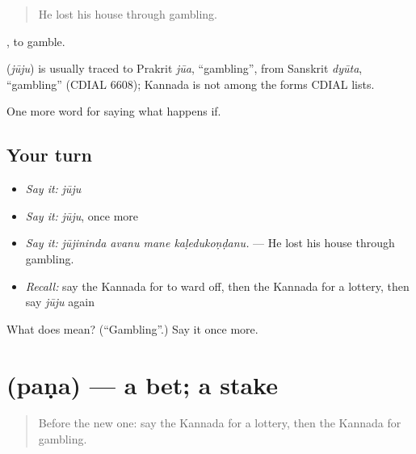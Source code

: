 \begin{quote}
He lost his house through gambling.
\end{quote}

, to gamble.

\begin{cousinweb}
\textbf{} (\emph{jūju}) is usually traced to Prakrit \emph{jūa}, \textquotedblleft{}gambling\textquotedblright{}, from Sanskrit \emph{dyūta}, \textquotedblleft{}gambling\textquotedblright{} (CDIAL 6608); Kannada is not among the forms CDIAL lists.
\end{cousinweb}

\begin{grammarlens}[title={What you've built}]
One more word for saying what happens if.
\end{grammarlens}

\subsection*{Your turn}
\begin{itemize}
\raggedright
  \item \emph{Say it:} \emph{jūju}
  \item \emph{Say it:} \emph{jūju}, once more
  \item \emph{Say it:} \emph{jūjininda avanu mane kaḷedukoṇḍanu.} — He lost his house through gambling.
  \item \emph{Recall:} say the Kannada for to ward off, then the Kannada for a lottery, then say \emph{jūju} again
\end{itemize}

\begin{tcolorbox}[breakable,colback=teal!4,colframe=teal!35!black,title={Before you move on}]
What does  mean? (\textquotedblleft{}Gambling\textquotedblright{}.) Say it once more.
\end{tcolorbox}
\section[\texorpdfstring{\kn{ಪಣ} (paṇa)}{ಪಣ (paṇa)}]{ (paṇa) — a bet; a stake}

\label{lesson:KA-C413-pana}



\begin{quote}
Before the new one: say the Kannada for a lottery, then the Kannada for gambling.
\end{quote}

